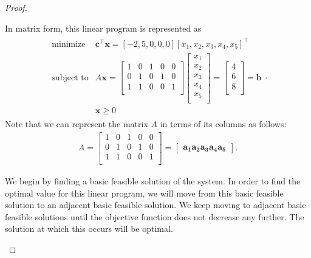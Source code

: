 \documentclass[12pt]{article}
\theoremstyle{definition}
\newcommand{\vect}[1]{\boldsymbol{#1}}
\begin{document}
\begin{proof}
\begin{enumerate}
      In matrix form, this linear program is represented as
      \begin{align*}
        \begin{array}{rl}
          \text{minimize} & \vect{c}^\intercal \vect{x} = [-2, 5, 0, 0, 0] [x_1, x_2, x_3, x_4, x_5]^\intercal \\
          \text{subject to} & A\vect{x} =
          \begin{bmatrix}
            1 & 0 & 1 & 0 & 0\\
            0 & 1 & 0 & 1 & 0\\
            1 & 1 & 0 & 0 & 1\\
          \end{bmatrix}
          \begin{bmatrix}
            x_1 \\
            x_2 \\
            x_3 \\
            x_4 \\
            x_5 \\
          \end{bmatrix} =
          \begin{bmatrix}
            4 \\
            6 \\
            8 \\
          \end{bmatrix} = \vect{b} \\
          & \vect{x} \geq 0
        \end{array}.
      \end{align*}
    Note that we can represent the matrix $A$ in terms of its columns as follows:
    \begin{align*}
      A =
      \begin{bmatrix}
        1 & 0 & 1 & 0 & 0\\
        0 & 1 & 0 & 1 & 0\\
        1 & 1 & 0 & 0 & 1\\
      \end{bmatrix}
      =
      \begin{bmatrix}
        \vect{a_1}
        \vect{a_2}
        \vect{a_3}
        \vect{a_4}
        \vect{a_5}
      \end{bmatrix}.
    \end{align*}

    We begin by finding a basic feasible solution of the system. In order to find the optimal value for this linear program, we will move from
    this basic feasible solution to an adjacent basic feasible solution. We keep moving
    to adjacent basic feasible solutions until the objective function does not decrease any further.
    The solution at which this occurs will be optimal.


\end{enumerate}
\end{proof}
\end{document}
